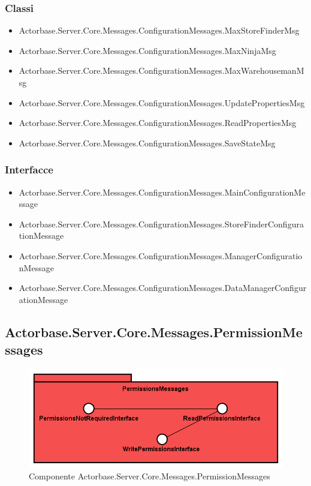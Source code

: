 \documentclass[a4paper]{article}
\begin{document}
			\subsubsection{Classi}
			\begin{itemize}
				\item Actorbase.Server.Core.Messages.ConfigurationMessages.MaxStoreFinderMsg
				\item Actorbase.Server.Core.Messages.ConfigurationMessages.MaxNinjaMsg
				\item Actorbase.Server.Core.Messages.ConfigurationMessages.MaxWarehousemanMsg
				\item Actorbase.Server.Core.Messages.ConfigurationMessages.UpdatePropertiesMsg
				\item Actorbase.Server.Core.Messages.ConfigurationMessages.ReadPropertiesMsg
				\item Actorbase.Server.Core.Messages.ConfigurationMessages.SaveStateMsg
			\end{itemize}
			\subsubsection{Interfacce}
			\begin{itemize}
				\item Actorbase.Server.Core.Messages.ConfigurationMessages.MainConfigurationMessage
				\item Actorbase.Server.Core.Messages.ConfigurationMessages.StoreFinderConfigurationMessage
				\item Actorbase.Server.Core.Messages.ConfigurationMessages.ManagerConfigurationMessage
				\item Actorbase.Server.Core.Messages.ConfigurationMessages.DataManagerConfigurationMessage
			\end{itemize}
			
			\subsection{Actorbase.Server.Core.Messages.PermissionMessages}
			\begin{figure} [H]
			\centering
			\includegraphics[scale=0.65]{Server/Package/PermissionsMessagesLevel.png}
			\caption{Componente Actorbase.Server.Core.Messages.PermissionMessages}
			\end{figure}
\end{document}
